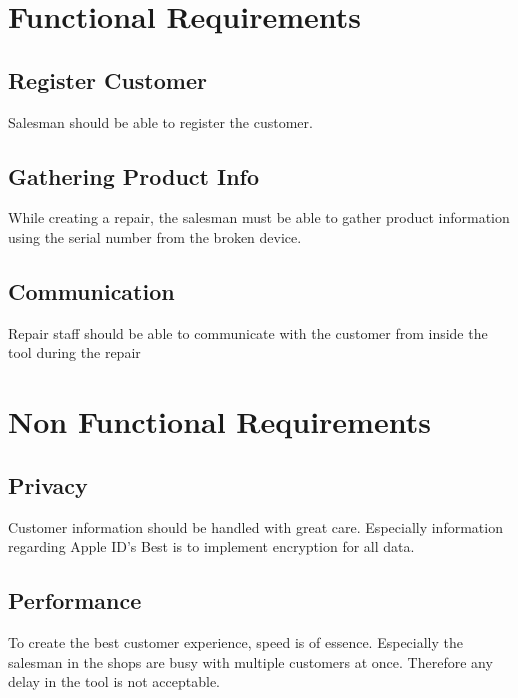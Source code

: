 \documentclass{article}
\begin{document}
\section{Functional Requirements}
\subsection{Register Customer}
Salesman should be able to register the customer.
\subsection{Gathering Product Info}
While creating a repair, the salesman must be able to gather product information using the serial number from the broken device.
\subsection{Communication}
Repair staff should be able to communicate with the customer from inside the tool during the repair

\section{Non Functional Requirements} 
\subsection{Privacy}
Customer information should be handled with great care. Especially information regarding Apple ID's Best is to implement encryption for all data. 
\subsection{Performance}
To create the best customer experience, speed is of essence. Especially the salesman in the shops are busy with multiple customers at once. Therefore any delay in the tool is not acceptable. 
\end{document}
